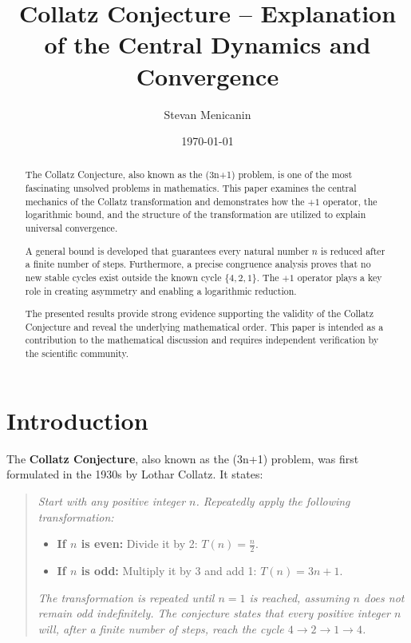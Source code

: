 \documentclass[a4paper,12pt]{article}
\title{Collatz Conjecture – Explanation of the Central Dynamics and Convergence}
\author{Stevan Menicanin}
\date{\today}
\begin{document}
\maketitle

\renewcommand{\abstractname}{Abstract}
\begin{abstract}
    The Collatz Conjecture, also known as the (3n+1) problem, is one of the most fascinating unsolved problems in mathematics. This paper examines the central mechanics of the Collatz transformation and demonstrates how the \(+1\) operator, the logarithmic bound, and the structure of the transformation are utilized to explain universal convergence.

    A general bound is developed that guarantees every natural number \( n \) is reduced after a finite number of steps. Furthermore, a precise congruence analysis proves that no new stable cycles exist outside the known cycle \( \{4, 2, 1\} \). The \(+1\) operator plays a key role in creating asymmetry and enabling a logarithmic reduction.


    The presented results provide strong evidence supporting the validity of the Collatz Conjecture and reveal the underlying mathematical order. This paper is intended as a contribution to the mathematical discussion and requires independent verification by the scientific community.
\end{abstract}

\newpage
\setcounter{tocdepth}{2} %

\tableofcontents

\newpage

\section{Introduction}
The \textbf{Collatz Conjecture}, also known as the (3n+1) problem, was first formulated in the 1930s by Lothar Collatz. It states:

\begin{quote}
\textit{Start with any positive integer \( n \). Repeatedly apply the following transformation:}
\begin{itemize}
    \item \textbf{If \( n \) is even:} Divide it by 2: \( T(n) = \frac{n}{2} \).
    \item \textbf{If \( n \) is odd:} Multiply it by 3 and add 1: \( T(n) = 3n + 1 \).
\end{itemize}
\textit{The transformation is repeated until \( n = 1 \) is reached, assuming \( n \) does not remain odd indefinitely. The conjecture states that every positive integer \( n \) will, after a finite number of steps, reach the cycle \( 4 \to 2 \to 1 \to 4 \).}
\end{quote}
\end{document}
